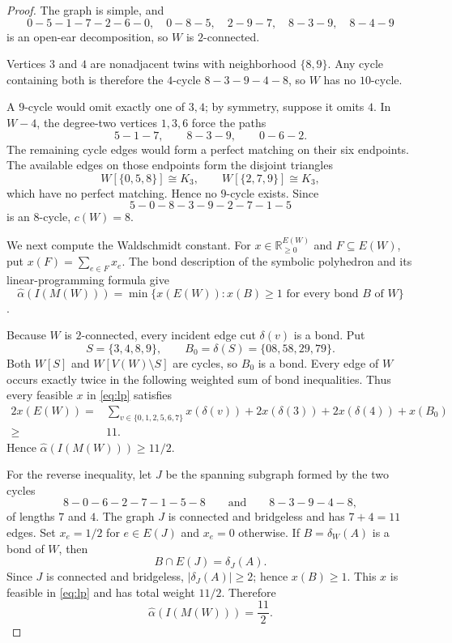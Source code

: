 \documentclass[11pt]{amsart}
\theoremstyle{remark}
\newcommand{\ahat}{\widehat{\alpha}}
\begin{document}
\begin{proof}
The graph is simple, and
\[
0-5-1-7-2-6-0,
\quad 0-8-5,
\quad 2-9-7,
\quad 8-3-9,
\quad 8-4-9
\]
is an open-ear decomposition, so $W$ is $2$-connected.

Vertices $3$ and $4$ are nonadjacent twins with neighborhood
$\{8,9\}$. Any cycle containing both is therefore the $4$-cycle
$8-3-9-4-8$, so $W$ has no $10$-cycle.

A $9$-cycle would omit exactly one of $3,4$; by symmetry, suppose it
omits $4$. In $W-4$, the degree-two vertices $1,3,6$ force the paths
\[
5-1-7,\qquad 8-3-9,\qquad 0-6-2.
\]
The remaining cycle edges would form a perfect matching on their six
endpoints. The available edges on those endpoints form the disjoint
triangles
\[
W[\{0,5,8\}]\cong K_3,
\qquad
W[\{2,7,9\}]\cong K_3,
\]
which have no perfect matching. Hence no $9$-cycle exists. Since
\[
5-0-8-3-9-2-7-1-5
\]
is an $8$-cycle, $c(W)=8$.

We next compute the Waldschmidt constant. For
$x\in\mathbb R_{\ge0}^{E(W)}$ and $F\subseteq E(W)$, put
$x(F)=\sum_{e\in F}x_e$. The bond description of the symbolic
polyhedron and its linear-programming formula give
\begin{equation}\label{eq:lp}
\ahat(I(M(W)))
=
\min\bigl\{
 x(E(W)):
 x(B)\ge1\text{ for every bond }B\text{ of }W
\bigr\}
\end{equation}
\cite[Corollary~2.2 and Theorem~2.3]{DFK}.

Because $W$ is $2$-connected, every incident edge cut $\delta(v)$ is
a bond. Put
\[
S=\{3,4,8,9\},
\qquad
B_0=\delta(S)=\{08,58,29,79\}.
\]
Both $W[S]$ and $W[V(W)\setminus S]$ are cycles, so $B_0$ is a bond.
Every edge of $W$ occurs exactly twice in the following weighted sum
of bond inequalities. Thus every feasible $x$ in \eqref{eq:lp}
satisfies
\[
\begin{split}
2x(E(W))
={}&\sum_{v\in\{0,1,2,5,6,7\}}x(\delta(v))
   +2x(\delta(3))+2x(\delta(4))+x(B_0)\\
\ge{}&11.
\end{split}
\]
Hence $\ahat(I(M(W)))\ge 11/2$.

For the reverse inequality, let $J$ be the spanning subgraph formed
by the two cycles
\[
8-0-6-2-7-1-5-8
\qquad\text{and}\qquad
8-3-9-4-8,
\]
of lengths $7$ and $4$. The graph $J$ is connected and bridgeless and
has $7+4=11$ edges. Set
$x_e=1/2$ for $e\in E(J)$ and $x_e=0$ otherwise. If
$B=\delta_W(A)$ is a bond of $W$, then
\[
B\cap E(J)=\delta_J(A).
\]
Since $J$ is connected and bridgeless, $|\delta_J(A)|\ge2$; hence
$x(B)\ge1$. This $x$ is feasible in \eqref{eq:lp} and has total
weight $11/2$. Therefore
\begin{equation}\label{eq:alpha}
\ahat(I(M(W)))=\frac{11}{2}.
\end{equation}


\end{proof}
\end{document}
